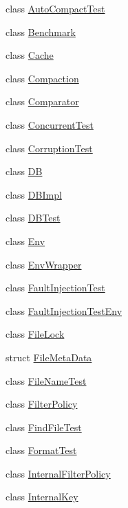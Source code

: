 \begin{DoxyCompactItemize}
\item 
class \mbox{\hyperlink{classleveldb_1_1_auto_compact_test}{Auto\+Compact\+Test}}
\item 
class \mbox{\hyperlink{classleveldb_1_1_benchmark}{Benchmark}}
\item 
class \mbox{\hyperlink{classleveldb_1_1_cache}{Cache}}
\item 
class \mbox{\hyperlink{classleveldb_1_1_compaction}{Compaction}}
\item 
class \mbox{\hyperlink{structleveldb_1_1_comparator}{Comparator}}
\item 
class \mbox{\hyperlink{classleveldb_1_1_concurrent_test}{Concurrent\+Test}}
\item 
class \mbox{\hyperlink{classleveldb_1_1_corruption_test}{Corruption\+Test}}
\item 
class \mbox{\hyperlink{classleveldb_1_1_d_b}{DB}}
\item 
class \mbox{\hyperlink{classleveldb_1_1_d_b_impl}{D\+B\+Impl}}
\item 
class \mbox{\hyperlink{classleveldb_1_1_d_b_test}{D\+B\+Test}}
\item 
class \mbox{\hyperlink{classleveldb_1_1_env}{Env}}
\item 
class \mbox{\hyperlink{classleveldb_1_1_env_wrapper}{Env\+Wrapper}}
\item 
class \mbox{\hyperlink{classleveldb_1_1_fault_injection_test}{Fault\+Injection\+Test}}
\item 
class \mbox{\hyperlink{classleveldb_1_1_fault_injection_test_env}{Fault\+Injection\+Test\+Env}}
\item 
class \mbox{\hyperlink{classleveldb_1_1_file_lock}{File\+Lock}}
\item 
struct \mbox{\hyperlink{structleveldb_1_1_file_meta_data}{File\+Meta\+Data}}
\item 
class \mbox{\hyperlink{classleveldb_1_1_file_name_test}{File\+Name\+Test}}
\item 
class \mbox{\hyperlink{classleveldb_1_1_filter_policy}{Filter\+Policy}}
\item 
class \mbox{\hyperlink{classleveldb_1_1_find_file_test}{Find\+File\+Test}}
\item 
class \mbox{\hyperlink{classleveldb_1_1_format_test}{Format\+Test}}
\item 
class \mbox{\hyperlink{classleveldb_1_1_internal_filter_policy}{Internal\+Filter\+Policy}}
\item 
class \mbox{\hyperlink{classleveldb_1_1_internal_key}{Internal\+Key}}

\end{DoxyCompactItemize}
